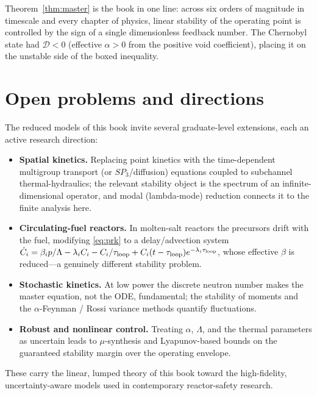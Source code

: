Theorem~\ref{thm:master} is the book in one line: across six orders of magnitude in
timescale and every chapter of physics, linear stability of the operating point is
controlled by the sign of a single dimensionless feedback number. The Chernobyl
state had $\mathcal D<0$ (effective $\alpha>0$ from the positive void coefficient),
placing it on the unstable side of the boxed inequality.

\section{Open problems and directions}
\label{sec:open}

The reduced models of this book invite several graduate-level extensions, each an
active research direction:
\begin{itemize}[leftmargin=*]
\item \textbf{Spatial kinetics.} Replacing point kinetics with the time-dependent
multigroup transport (or $SP_3$/diffusion) equations coupled to subchannel
thermal-hydraulics; the relevant stability object is the spectrum of an
infinite-dimensional operator, and modal (lambda-mode) reduction connects it to the
finite analysis here.
\item \textbf{Circulating-fuel reactors.} In molten-salt reactors the precursors
drift with the fuel, modifying \eqref{eq:prk} to a delay/advection system
$\dot C_i=\beta_i p/\Lambda-\lambda_iC_i-C_i/\tau_{\rm loop}+C_i(t-\tau_{\rm loop})e^{-\lambda_i\tau_{\rm loop}}$,
whose effective $\beta$ is reduced---a genuinely different stability problem.
\item \textbf{Stochastic kinetics.} At low power the discrete neutron number makes
the master equation, not the ODE, fundamental; the stability of moments and the
$\alpha$-Feynman / Rossi variance methods quantify fluctuations.
\item \textbf{Robust and nonlinear control.} Treating $\alpha$, $\Lambda$, and the
thermal parameters as uncertain leads to $\mu$-synthesis and Lyapunov-based bounds
on the guaranteed stability margin over the operating envelope.
\end{itemize}
These carry the linear, lumped theory of this book toward the high-fidelity,
uncertainty-aware models used in contemporary reactor-safety research.


